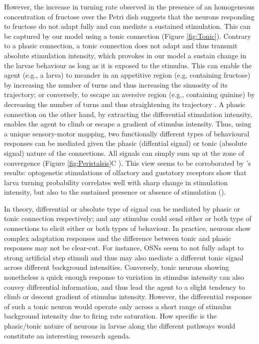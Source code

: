 \documentclass[11pt,a4paper]{article}
\newcommand{\todoBW}[1]{\todo[author=BW,color=orange, size=\tiny,inline]{1}}
\begin{document}
However, the increase in turning rate observed in the presence of an homogeneous concentration of fructose over the Petri dish \cite{schleyer2015learning} suggests that the neurons responding to fructose do not adapt fully and can mediate a sustained stimulation. This can be captured by our model using a tonic connection (Figure \ref{fig:Tonic}). Contrary to a phasic connection, a tonic connection does not adapt and thus transmit absolute stimulation intensity, which provokes in our model a sustain change in the larvae behaviour as long as it is exposed to the stimulus. This can enable the agent (e.g., a larva) to meander in an appetitive region (e.g, containing fructose) by increasing the number of turns and thus increasing the sinuosity of its trajectory; or conversely, to escape an aversive region (e.g., containing quinine) by decreasing the number of turns and thus straightening its trajectory \citep{benhamou1989animals}. A phasic connection on the other hand, by extracting the differential stimulation intensity, enables the agent to climb or escape a gradient of stimulus intensity. Thus, using a unique sensory-motor mapping, two functionally different types of behavioural responses can be mediated given the phasic (diffential signal) or tonic (absolute signal) nature of the connections. All signals can simply sum up at the zone of convergence (Figure \ref{fig:Peristalsis}C ). This view seems to be corroborated by \cite{hernandez2015reverse}'s results: optogenetic stimulations of olfactory and gustatory receptors show that larva turning probability correlates well with sharp change in stimulation intensity, but also to the sustained presence or absence of stimulation (\citep{gepner2015computations,hernandez2015reverse}).

\todoBW{following not clearly expressed}
In theory, differential or absolute type of signal can be mediated by phasic or tonic connection respectively; and any stimulus could send either or both type of connections to elicit either or both types of behaviour. In practice, neurons show complex adaptation responses and the difference between tonic and phasic responses may not be clear-cut. For instance, OSNs seem to not fully adapt to strong artificial step stimuli \citep{nagel2011biophysical, schulze2015dynamical} and thus may also mediate a different tonic signal across different background intensities. Conversely, tonic neurons showing nonetheless a quick enough response to variation in stimulus intensity can also convey differential information, and thus lead the agent to a slight tendency to climb or descent gradient of stimulus intensity. However, the differential response of such a tonic neuron would operate only across a short range of stimulus background intensity due to firing rate saturation. How specific is the phasic/tonic nature of neurons in larvae along the different pathways would constitute an interesting research agenda.
\end{document}
